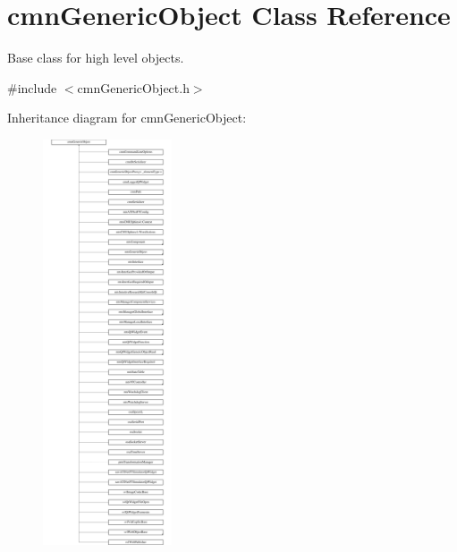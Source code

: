 \hypertarget{classcmn_generic_object}{\section{cmn\-Generic\-Object Class Reference}
\label{classcmn_generic_object}
}


Base class for high level objects.  




{\ttfamily \#include $<$cmn\-Generic\-Object.\-h$>$}

Inheritance diagram for cmn\-Generic\-Object\-:\begin{figure}[H]
\begin{center}
\leavevmode
\includegraphics[height=12.000000cm]{d0/d24/classcmn_generic_object}
\end{center}
\end{figure}
